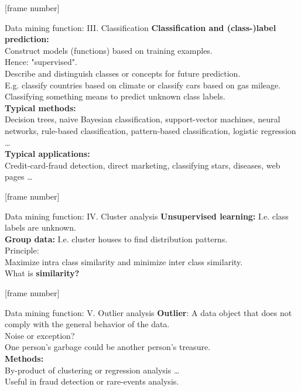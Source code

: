 \documentclass[aspectratio=169,t]{beamer}
\begin{document}
  {
    [frame number]
    \begin{frame}{Data mining function: III. Classification}
    \textbf{Classification and (class-)label prediction:}\\
    Construct models (functions) based on training examples. \\
    Hence: "supervised".\\
    Describe and distinguish classes or concepts for future prediction.\\
    E.g. classify countries based on climate or classify cars based on gas mileage.\\
    Classifying something means to predict unknown class labels. \\[0.5cm]

    \textbf{Typical methods:}\\
    Decision trees, naive Bayesian classification, support-vector machines, neural networks, rule-based classification, pattern-based classification, logistic regression \ldots\\[0.5cm]

    \textbf{Typical applications:}\\
    Credit-card-fraud detection, direct marketing, classifying stars, diseases, web pages \ldots
    \end{frame}
  }

  {
    [frame number]
    \begin{frame}{Data mining function: IV. Cluster analysis}
    \textbf{Unsupervised learning:} I.e. class labels are unknown.\\
    \textbf{Group data:} I.e. cluster houses to find distribution patterns.\\[0.5cm]

    Principle:\\
    Maximize intra class similarity and minimize inter class similarity.\\[0.5cm]

    What is \textbf{similarity?}
    \end{frame}
  }

  {
    [frame number]
    \begin{frame}{Data mining function: V. Outlier analysis}
    \textbf{Outlier}: A data object that does not comply with the general behavior of the data.\\[0.5cm]

    Noise or exception?\\
    One person's garbage could be another person's treasure.\\[0.5cm]

    \textbf{Methods:}\\
    By-product of clustering or regression analysis \ldots \\
    Useful in fraud detection or rare-events analysis.
    \end{frame}
  }
\end{document}
